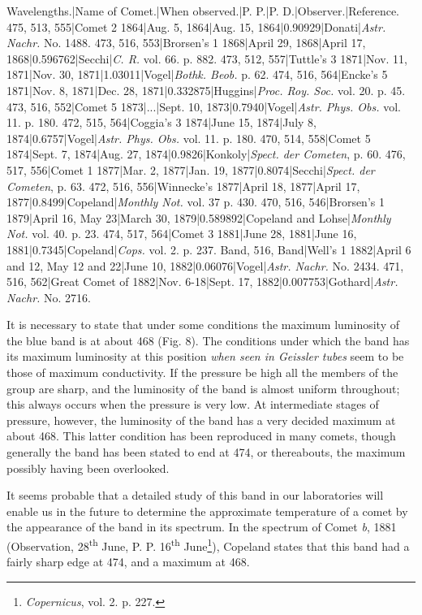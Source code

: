 \documentclass[a4paper, 12pt, oneside, polutonikogreek, english]{article}
\begin{document}
Wavelengths.|Name of Comet.|When observed.|P. P.|P. D.|Observer.|Reference. 
475, 513, 555|Comet 2 1864|Aug. 5, 1864|Aug. 15, 1864|0.90929|Donati|\emph{Astr. Nachr.} No. 1488. 
473, 516, 553|Brorsen's 1 1868|April 29, 1868|April 17, 1868|0.596762|Secchi|\emph{C. R.} vol. 66. p. 882. 
473, 512, 557|Tuttle's 3 1871|Nov. 11, 1871|Nov. 30, 1871|1.03011|Vogel|\emph{Bothk. Beob.} p. 62. 
474, 516, 564|Encke's 5 1871|Nov. 8, 1871|Dec. 28, 1871|0.332875|Huggins|\emph{Proc. Roy. Soc.} vol. 20. p. 45. 
473, 516, 552|Comet 5 1873|...|Sept. 10, 1873|0.7940|Vogel|\emph{Astr. Phys. Obs.} vol. 11. p. 180. 
472, 515, 564|Coggia's 3 1874|June 15, 1874|July 8, 1874|0.6757|Vogel|\emph{Astr. Phys. Obs.} vol. 11. p. 180. 
470, 514, 558|Comet 5 1874|Sept. 7, 1874|Aug. 27, 1874|0.9826|Konkoly|\emph{Spect. der Cometen}, p. 60. 
476, 517, 556|Comet 1 1877|Mar. 2, 1877|Jan. 19, 1877|0.8074|Secchi|\emph{Spect. der Cometen}, p. 63. 
472, 516, 556|Winnecke's 1877|April 18, 1877|April 17, 1877|0.8499|Copeland|\emph{Monthly Not.} vol. 37 p. 430. 
470, 516, 546|Brorsen's 1 1879|April 16, May 23|March 30, 1879|0.589892|Copeland and Lohse|\emph{Monthly Not.} vol. 40. p. 23. 
474, 517, 564|Comet 3 1881|June 28, 1881|June 16, 1881|0.7345|Copeland|\emph{Cops.} vol. 2. p. 237. 
Band, 516, Band|Well's 1 1882|April 6 and 12, May 12 and 22|June 10, 1882|0.06076|Vogel|\emph{Astr. Nachr.} No. 2434. 
471, 516, 562|Great Comet of 1882|Nov. 6-18|Sept. 17, 1882|0.007753|Gothard|\emph{Astr. Nachr.} No. 2716. 

It is necessary to state that under some conditions the maximum luminosity of the blue band is at about 468 (Fig. 8). The conditions under which the band has its maximum luminosity at this position \emph{when seen in Geissler tubes} seem to be those of maximum conductivity. If the pressure be high all the members of the group are sharp, and the luminosity of the band is almost uniform throughout; this always occurs when the pressure is very low. At intermediate stages of pressure, however, the luminosity of the band has a very decided maximum at about 468. This latter condition has been reproduced in many comets, though generally the band has been stated to end at 474, or thereabouts, the maximum possibly having been overlooked.

It seems probable that a detailed study of this band in our laboratories will enable us in the future to determine the approximate temperature of a comet by the appearance of the band in its spectrum. In the spectrum of Comet \emph{b}, 1881 (Observation, 28\textsuperscript{th} June, P. P. 16\textsuperscript{th} June\footnote{\emph{Copernicus}, vol. 2. p. 227.}), Copeland states that this band had a fairly sharp edge at 474, and a maximum at 468.
\end{document}
